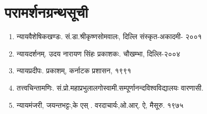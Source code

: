 {\section*{परामर्शनग्रन्थसूची}
\begin{enumerate}
\itemsep=0pt
\item न्यायवैशेषिकखण्डः. सं.डा.श्रीकृष्णसोमवालः, दिल्लि संस्कृत-अकादमी- २००१
\item न्यायदर्शनम्. उदय नारायण सिंहः प्रकाशकः. चौखम्भा, दिल्लि-२००४
\item न्यायप्रदीपः. प्रकाशम्, कर्नाटक प्रशासन, १९९१
\item तत्त्वचिन्तामणिः. सं.प्रो.महाप्रभुलालगोस्वामी.सम्पूर्णानन्दविश्वविद्यालयः वारणासी.
\item न्यायमंजरी, जयन्तभट्टः,के एस् . वरदाचार्यः,ओ.आर्. ऐ, मैसूरु. १९७५
\end{enumerate}

\articleend
}
